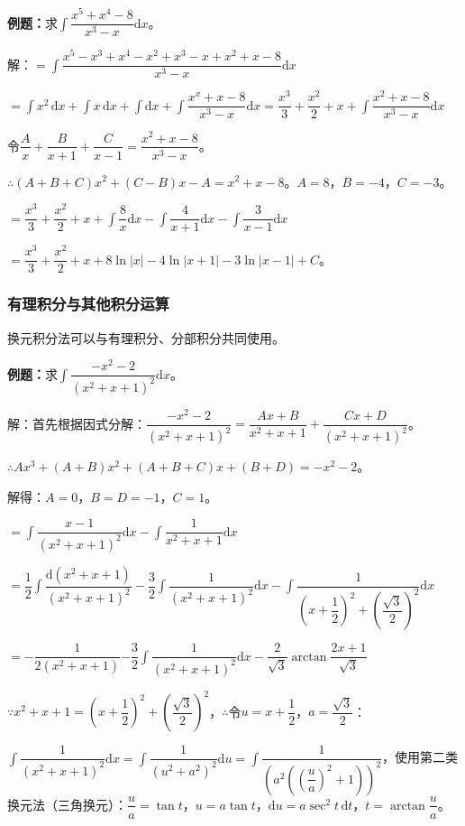 \documentclass[UTF8, 12pt]{ctexart}
\begin{document}
\textbf{例题：}求$\displaystyle{\int\dfrac{x^5+x^4-8}{x^3-x}\textrm{d}x}$。

解：$=\displaystyle{\int\dfrac{x^5-x^3+x^4-x^2+x^3-x+x^2+x-8}{x^3-x}\textrm{d}x}$

$=\int x^2\,\textrm{d}x+\int x\,\textrm{d}x+\int\textrm{d}x+\displaystyle{\int\dfrac{x^x+x-8}{x^3-x}\textrm{d}x}=\dfrac{x^3}{3}+\dfrac{x^2}{2}+x+\displaystyle{\int\dfrac{x^2+x-8}{x^3-x}\textrm{d}x}$

令$\dfrac{A}{x}+\dfrac{B}{x+1}+\dfrac{C}{x-1}=\dfrac{x^2+x-8}{x^3-x}$。

$\therefore(A+B+C)x^2+(C-B)x-A=x^2+x-8$。$A=8$，$B=-4$，$C=-3$。

$=\dfrac{x^3}{3}+\dfrac{x^2}{2}+x+\displaystyle{\int\dfrac{8}{x}\textrm{d}x-\int\dfrac{4}{x+1}\textrm{d}x-\int\dfrac{3}{x-1}\textrm{d}x}$

$=\dfrac{x^3}{3}+\dfrac{x^2}{2}+x+8\ln\vert x\vert-4\ln\vert x+1\vert-3\ln\vert x-1\vert+C$。

\subsubsection{有理积分与其他积分运算}

换元积分法可以与有理积分、分部积分共同使用。

\textbf{例题：}求$\displaystyle{\int\dfrac{-x^2-2}{(x^2+x+1)^2}\textrm{d}x}$。

解：首先根据因式分解：$\dfrac{-x^2-2}{(x^2+x+1)^2}=\dfrac{Ax+B}{x^2+x+1}+\dfrac{Cx+D}{(x^2+x+1)^2}$。

$\therefore Ax^3+(A+B)x^2+(A+B+C)x+(B+D)=-x^2-2$。

解得：$A=0$，$B=D=-1$，$C=1$。

$=\displaystyle{\int\dfrac{x-1}{(x^2+x+1)^2}\textrm{d}x-\int\dfrac{1}{x^2+x+1}\textrm{d}x}$

$=\displaystyle{\dfrac{1}{2}\int\dfrac{\textrm{d}(x^2+x+1)}{(x^2+x+1)^2}-\dfrac{3}{2}\int\dfrac{1}{(x^2+x+1)^2}\textrm{d}x-\int\dfrac{1}{\left(x+\dfrac{1}{2}\right)^2+\left(\dfrac{\sqrt{3}}{2}\right)^2}\textrm{d}x}$

$=-\dfrac{1}{2(x^2+x+1)}\displaystyle{-\dfrac{3}{2}\int\dfrac{1}{(x^2+x+1)^2}\textrm{d}x}-\dfrac{2}{\sqrt{3}}\arctan\dfrac{2x+1}{\sqrt{3}}$ \smallskip

$\because x^2+x+1=\left(x+\dfrac{1}{2}\right)^2+\left(\dfrac{\sqrt{3}}{2}\right)^2$，$\therefore$令$u=x+\dfrac{1}{2}$，$a=\dfrac{\sqrt{3}}{2}$：

$\displaystyle{\int\dfrac{1}{(x^2+x+1)^2}\textrm{d}x=\int\dfrac{1}{(u^2+a^2)^2}\textrm{d}u=\int\dfrac{1}{\left(a^2\left(\left(\dfrac{u}{a}\right)^2+1\right)\right)^2}}$，使用第二类换元法（三角换元）：$\dfrac{u}{a}=\tan t$，$u=a\tan t$，$\textrm{d}u=a\sec^2t\,\textrm{d}t$，$t=\arctan\dfrac{u}{a}$。
\end{document}
